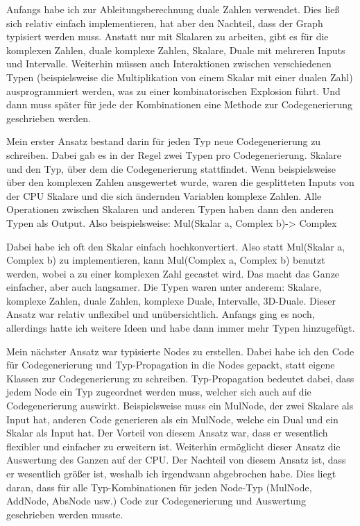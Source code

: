 \documentclass[
	ngerman,%
	accentcolor=9c,%
	ruledheaders=section,%
	class=report,%
	thesis={type=bachelor},%
	fontsize=11pt,%
	parskip=half-,%
	custommargins=true,%
	marginpar=false,%
]{tudapub}
\begin{document}
Anfangs habe ich zur Ableitungsberechnung duale Zahlen verwendet. Dies ließ sich relativ einfach implementieren, hat aber den Nachteil, dass der Graph typisiert werden muss. Anstatt nur mit Skalaren zu arbeiten, gibt es für die komplexen Zahlen, duale komplexe Zahlen, Skalare, Duale mit mehreren Inputs und Intervalle. Weiterhin müssen auch Interaktionen zwischen verschiedenen Typen (beispielsweise die Multiplikation von einem Skalar mit einer dualen Zahl) ausprogrammiert werden, was zu einer kombinatorischen Explosion führt. Und dann muss später für jede der Kombinationen eine Methode zur Codegenerierung geschrieben werden. 

Mein erster Ansatz bestand darin für jeden Typ neue Codegenerierung zu schreiben. Dabei gab es in der Regel zwei Typen pro Codegenerierung. Skalare und den Typ, über dem die Codegenerierung stattfindet. Wenn beispielsweise über den komplexen Zahlen ausgewertet wurde, waren die gesplitteten Inputs von der CPU Skalare und die sich ändernden Variablen komplexe Zahlen. Alle Operationen zwischen Skalaren und anderen Typen haben dann den anderen Typen als Output. Also beispielsweise:
Mul(Skalar a, Complex b)-> Complex

Dabei habe ich oft den Skalar einfach hochkonvertiert. Also statt Mul(Skalar a, Complex b) zu implementieren, kann Mul(Complex a, Complex b) benutzt werden, wobei a zu einer komplexen Zahl gecastet wird. Das macht das Ganze einfacher, aber auch langsamer.
Die Typen waren unter anderem: Skalare, komplexe Zahlen, duale Zahlen, komplexe Duale, Intervalle, 3D-Duale.
Dieser Ansatz war relativ unflexibel und unübersichtlich. Anfangs ging es noch, allerdings hatte ich weitere Ideen und habe dann immer mehr Typen hinzugefügt.


Mein nächster Ansatz war typisierte Nodes zu erstellen. Dabei habe ich den Code für Codegenerierung und Typ-Propagation in die Nodes gepackt, statt eigene Klassen zur Codegenerierung zu schreiben.
Typ-Propagation bedeutet dabei, dass jedem Node ein Typ zugeordnet werden muss, welcher sich auch auf die Codegenerierung auswirkt. Beispielsweise muss ein MulNode, der zwei Skalare als Input hat, anderen Code generieren als ein MulNode, welche ein Dual und ein Skalar als Input hat. 
Der Vorteil von diesem Ansatz war, dass er wesentlich flexibler und einfacher zu erweitern ist. Weiterhin ermöglicht dieser Ansatz die Auswertung des Ganzen auf der CPU. Der Nachteil von diesem Ansatz ist, dass er wesentlich größer ist, weshalb ich irgendwann abgebrochen habe. Dies liegt daran, dass für alle Typ-Kombinationen für jeden Node-Typ (MulNode, AddNode, AbsNode usw.) Code zur Codegenerierung und Auswertung geschrieben werden musste.
\end{document}
